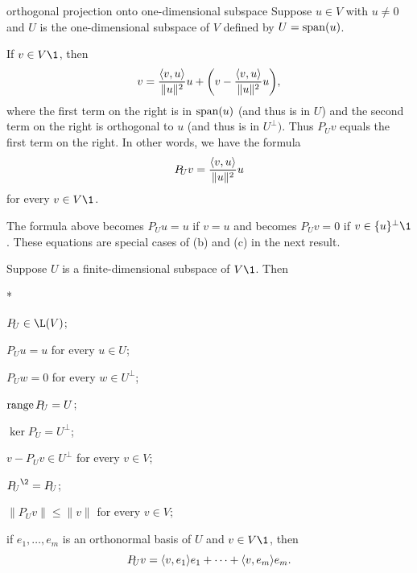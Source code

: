 \begin{example}{orthogonal projection onto one-dimensional subspace}
Suppose $u \in V$ with $u \ne 0$ and $U$ is the one-dimensional subspace of $V$ defined by $U = \operatorname{span}(u)$.

If $v \in V\1$, then
\[
v = \frac{\ip{v, u}}{\|u\|^2} u + \paren[\bigg]{ v - \frac{\ip{v, u}}{\|u\|^2} u },
\]
where the first term on the right is in $\operatorname{span}(u)$ (and thus is in $U$) and the second term on the right is orthogonal to $u$ (and thus is in $U^\perp)$. Thus $P_{\!U} v$ equals the first term on the right. In other words, we have the formula
\[
P_{\!U} v = \frac{\ip{v, u}}{\|u\|^2} u
\]
for every $v \in V\1$.

The formula above becomes $P_{\!U} u = u$ if $v = u$ and becomes $P_{\!U} v = 0$ if $v \in \br{u}^\perp\1$. These equations are special cases of (b) and (c) in the next result.
\end{example}

\pagebreak[3]

{Suppose $U$ is a finite-dimensional subspace of $V\1$. Then
\begin{subtheorem}* 

\item
$P_{\!U} \in \L(V)$;

\item
$P_{\!U} u = u$ for every $u \in U$;

\item
$P_{\!U} w = 0$ for every $w \in U^\perp$;

\item
$\operatorname{range} P_{\!U} = U$;

\item
$\ker P_{\!U} = U^\perp$;

\item
$v - P_{\!U} v \in U^\perp$ for every $v \in V$;

\item
${P_{\!U}}^{\2} = P_{\!U}$;

\item
$\|P_{\!U} v\| \le \|v\|$ for every $v \in V$;

\item
if $e_1, \dots, e_m$ is an orthonormal basis of $U$ and $v \in V\1$, then
\[
P_{\!U} v = \langle v, e_1\rangle e_1 + \dots + \langle v, e_m\rangle e_m.
\]
\end{subtheorem}}

\pagebreak[3]

